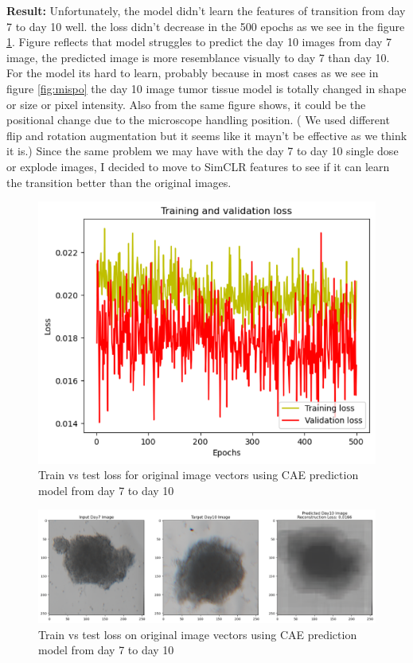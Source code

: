 \textbf{Result:}
Unfortunately, the model didn't learn the features of transition from day 7 to day 10 well. the loss didn't decrease in the 500 epochs as we see in the figure \ref{fig:uloss}.  Figure reflects that
model struggles to predict the day 10 images from day 7 image, the predicted image is more resemblance visually to day 7 than day 10. For the model its hard to learn, probably because in most cases as we see in figure \ref{fig:mispo} the day 10 image tumor tissue model is totally changed in 
shape or size or  pixel intensity. Also from the same figure shows, it could be the positional change due to the microscope handling position. ( We used different flip and rotation 
augmentation but it seems like it mayn't be effective as we think it is.) Since the same problem we may have with the day 7 to day 10 single dose or explode images, I decided to move to
SimCLR features to see if it can learn the transition better than the original images. 
\begin{figure}[H]
  \centering
  \includegraphics[scale=0.46]{figures/rankloss.png} 
  \caption{Train vs test loss for original image vectors using CAE prediction model from day 7 to day 10}
  \label{fig:uloss}
\end{figure}

\begin{figure}[H]
  \centering
  \includegraphics[scale=0.46]{figures/unpred.png} 
  \caption{Train vs test loss on original image vectors using CAE prediction model from day 7 to day 10}
  \label{fig:unloss}
\end{figure}


